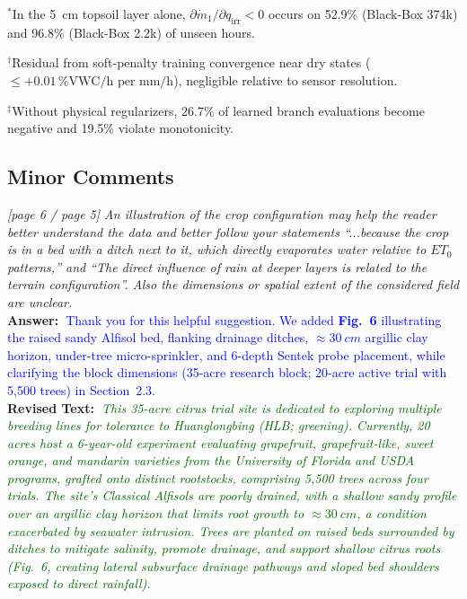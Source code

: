 \documentclass[10pt]{article}
\newcommand{\query}[2][]{\ifthenelse{\equal{#1}{}}{}{\textbf{#1:}~}\emph{#2}}
\newcommand{\ans}[1]{\textbf{Answer:~}#1}
\newcommand{\Rtext}[1]{\textbf{Revised Text:~}#1}
\begin{document}
\begin{center}
\begin{minipage}{0.98\linewidth}
\vspace{2pt}
{\footnotesize\color{blue}\raggedright
$^*$In the 5~\si{cm} topsoil layer alone, $\partial \dot{m}_1/\partial q_{\mathrm{irr}} < 0$ occurs on 52.9\% (Black-Box 374k) and 96.8\% (Black-Box 2.2k) of unseen hours.\par
$^\dagger$Residual from soft-penalty training convergence near dry states ($\le +0.01\,\text{\%VWC/h per mm/h}$), negligible relative to sensor resolution.\par
$^\ddagger$Without physical regularizers, 26.7\% of learned branch evaluations become negative and 19.5\% violate monotonicity.\par}
\end{minipage}
\end{center}

\subsection*{Minor Comments}

\query[R-1.4]{[page 6 / page 5] An illustration of the crop configuration may help the reader better understand the data and better follow your statements ``...because the crop is in a bed with a ditch next to it, which directly evaporates water relative to $ET_0$ patterns,'' and ``The direct influence of rain at deeper layers is related to the terrain configuration''. Also the dimensions or spatial extent of the considered field are unclear.}\\
\ans{\textcolor{blue}{Thank you for this helpful suggestion. We added \textbf{Fig.~6} illustrating the raised sandy Alfisol bed, flanking drainage ditches, $\approx\SI{30}{cm}$ argillic clay horizon, under-tree micro-sprinkler, and 6-depth Sentek probe placement, while clarifying the block dimensions (35-acre research block; 20-acre active trial with 5,500 trees) in Section~2.3.}}\\
\Rtext{\emph{\textcolor{darkgreen}{This 35-acre citrus trial site is dedicated to exploring multiple breeding lines for tolerance to Huanglongbing (HLB; greening). Currently, 20 acres host a 6-year-old experiment evaluating grapefruit, grapefruit-like, sweet orange, and mandarin varieties from the University of Florida and USDA programs, grafted onto distinct rootstocks, comprising 5,500 trees across four trials. The site's Classical Alfisols are poorly drained, with a shallow sandy profile over an argillic clay horizon that limits root growth to $\approx\SI{30}{cm}$, a condition exacerbated by seawater intrusion. Trees are planted on raised beds surrounded by ditches to mitigate salinity, promote drainage, and support shallow citrus roots (Fig.~6, creating lateral subsurface drainage pathways and sloped bed shoulders exposed to direct rainfall).}}}
\end{document}
